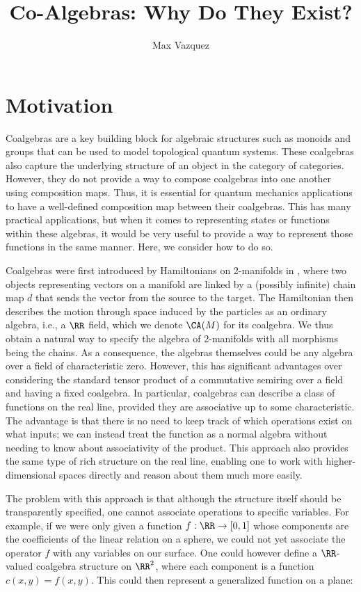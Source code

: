 \documentclass[a4paper,reqno,oneside]{article}
\begin{document}
\title{Co-Algebras: Why Do They Exist?}
\author{Max Vazquez}
\maketitle


\section*{Motivation} Coalgebras are a key building block for algebraic structures such as monoids and groups that can be used to model topological quantum systems. These coalgebras also capture the underlying structure of an object in the category of categories. However, they do not provide a way to compose coalgebras into one another using composition maps. Thus, it is essential for quantum mechanics applications to have a well-defined composition map between their coalgebras. This has many practical applications, but when it comes to representing states or functions within these algebras, it would be very useful to provide a way to represent those functions in the same manner. Here, we consider how to do so.

Coalgebras were first introduced by Hamiltonians on 2-manifolds in \cite{Hamiltonian_On_2Manifolds}, where two objects representing vectors on a manifold are linked by a (possibly infinite) chain map $d$ that sends the vector from the source to the target. The Hamiltonian then describes the motion through space induced by the particles as an ordinary algebra, i.e., a $\RR$ field, which we denote $\CA(M)$ for its coalgebra. We thus obtain a natural way to specify the algebra of 2-manifolds with all morphisms being the chains. As a consequence, the algebras themselves could be any algebra over a field of characteristic zero. However, this has significant advantages over considering the standard tensor product of a commutative semiring over a field and having a fixed coalgebra. In particular, coalgebras can describe a class of functions on the real line, provided they are associative up to some characteristic. The advantage is that there is no need to keep track of which operations exist on what inputs; we can instead treat the function as a normal algebra without needing to know about associativity of the product. This approach also provides the same type of rich structure on the real line, enabling one to work with higher-dimensional spaces directly and reason about them much more easily. 

The problem with this approach is that although the structure itself should be transparently specified, one cannot associate operations to specific variables. For example, if we were only given a function $f : \RR \to [0,1]$ whose components are the coefficients of the linear relation on a sphere, we could not yet associate the operator $f$ with any variables on our surface. One could however define a $\RR$-valued coalgebra structure on $\RR^2$, where each component is a function $c(x,y) = f(x,y)$. This could then represent a generalized function on a plane: 
\end{document}
